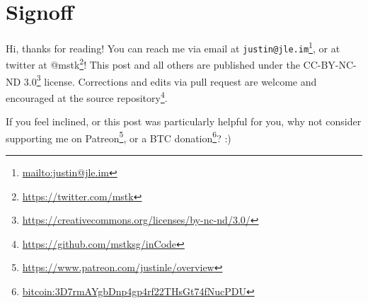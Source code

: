 \documentclass[]{article}
\renewcommand{\href}[2]{#2\footnote{\url{#1}}}
\begin{document}
\section{Signoff}\label{signoff}

Hi, thanks for reading! You can reach me via email at
\href{mailto:justin@jle.im}{\nolinkurl{justin@jle.im}}, or at twitter at
\href{https://twitter.com/mstk}{@mstk}! This post and all others are published
under the \href{https://creativecommons.org/licenses/by-nc-nd/3.0/}{CC-BY-NC-ND
3.0} license. Corrections and edits via pull request are welcome and encouraged
at \href{https://github.com/mstksg/inCode}{the source repository}.

If you feel inclined, or this post was particularly helpful for you, why not
consider \href{https://www.patreon.com/justinle/overview}{supporting me on
Patreon}, or a \href{bitcoin:3D7rmAYgbDnp4gp4rf22THsGt74fNucPDU}{BTC donation}?
:)
\end{document}
